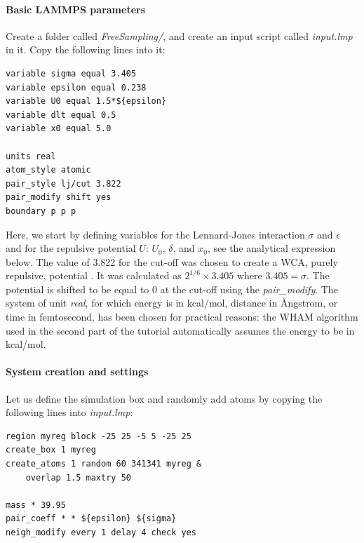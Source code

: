 \documentclass[9pt,tutorial]{livecoms}
\begin{document}
\paragraph{Basic LAMMPS parameters}
\noindent Create a folder called \textit{FreeSampling/}, and create an input
script called \textit{input.lmp} in it. Copy the following lines into it:
{\normalsize \begin{verbatim}
variable sigma equal 3.405
variable epsilon equal 0.238
variable U0 equal 1.5*${epsilon}
variable dlt equal 0.5
variable x0 equal 5.0

units real
atom_style atomic
pair_style lj/cut 3.822
pair_modify shift yes
boundary p p p
\end{verbatim}}
Here, we start by defining variables for the Lennard-Jones interaction
$\sigma$ and $\epsilon$ and for the repulsive potential $U$: $U_0$, $\delta$, and $x_0$,
see the analytical expression below. The value of 3.822 for the cut-off was chosen to
create a WCA, purely repulsive, potential \cite{weeks1971role}. It was calculated
as $2^{1/6} \times 3.405$ where $3.405 = \sigma$. The potential is shifted to be
equal to 0 at the cut-off using the \textit{pair\_modify}. The system of unit
\textit{real}, for which energy is in kcal/mol, distance in Ångstrom, or time in
femtosecond, has been chosen for practical reasons: the WHAM algorithm used in
the second part of the tutorial automatically assumes the energy to be in kcal/mol.

\paragraph{System creation and settings}
\noindent Let us define the simulation box and randomly add atoms by copying the
following lines into \textit{input.lmp}:
{\normalsize \begin{verbatim}
region myreg block -25 25 -5 5 -25 25
create_box 1 myreg
create_atoms 1 random 60 341341 myreg &
    overlap 1.5 maxtry 50

mass * 39.95
pair_coeff * * ${epsilon} ${sigma}
neigh_modify every 1 delay 4 check yes
\end{verbatim}}
\end{document}
